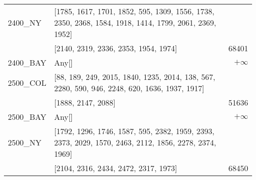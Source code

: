 \documentclass[main.tex]{subfiles}
\begin{document}
\begin{center}
\begin{tabular}{llr}
2400\_NY & [1785, 1617, 1701, 1852, 595, 1309, 1556, 1738, 2350, 2368, 1584, 1918, 1414, 1799, 2061, 2369, 1952]\\ & [2140, 2319, 2336, 2353, 1954, 1974] & 68401\\
2400\_BAY & Any[] & $+\infty$\\
2500\_COL & [88, 189, 249, 2015, 1840, 1235, 2014, 138, 567, 2280, 590, 946, 2248, 620, 1636, 1937, 1917]\\ & [1888, 2147, 2088] & 51636\\
2500\_BAY & Any[] & $+\infty$\\
2500\_NY & [1792, 1296, 1746, 1587, 595, 2382, 1959, 2393, 2373, 2029, 1570, 2463, 2112, 1856, 2278, 2374, 1969]\\ & [2104, 2316, 2434, 2472, 2317, 1973] & 68450\\
\hline\end{tabular}
\end{center}
\end{document}
